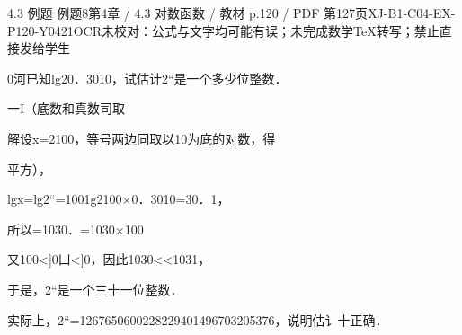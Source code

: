 \begin{bankitem}{4.3 例题 例题8}{第4章 / 4.3 对数函数 / 教材 p.120 / PDF 第127页}{XJ-B1-C04-EX-P120-Y0421}{OCR未校对：公式与文字均可能有误；未完成数学TeX转写；禁止直接发给学生}
\begin{ocrdraft}
\par
0河已知lg20．3010，试估计2“是一个多少位整数．
\par
一I（底数和真数司取
\par
解设x=2100，等号两边同取以10为底的对数，得
\par
平方），
\par
lgx=lg2“=1001g2100\ensuremath{\times}0．3010=30．1，
\par
所以=1030．=1030\ensuremath{\times}100
\par
又100<]0凵<]0，因此1030<<1031，
\par
于是，2“是一个三十一位整数．
\par
实际上，2“=1267650600228229401496703205376，说明估讠十正确．
\end{ocrdraft}
\end{bankitem}
